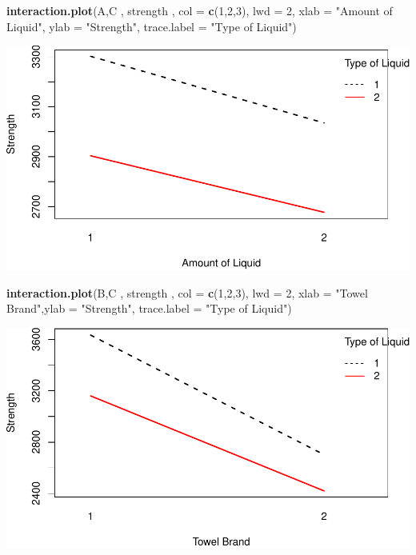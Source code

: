 \documentclass[12pt,]{article}
\newenvironment{Shaded}{\begin{snugshade}}{\end{snugshade}}
\newcommand{\KeywordTok}[1]{\textcolor[rgb]{0.13,0.29,0.53}{\textbf{#1}}}
\newcommand{\DataTypeTok}[1]{\textcolor[rgb]{0.13,0.29,0.53}{#1}}
\newcommand{\DecValTok}[1]{\textcolor[rgb]{0.00,0.00,0.81}{#1}}
\newcommand{\StringTok}[1]{\textcolor[rgb]{0.31,0.60,0.02}{#1}}
\newcommand{\NormalTok}[1]{#1}
\begin{document}
\begin{Shaded}
\begin{Highlighting}[]
\KeywordTok{interaction.plot}\NormalTok{(A,C , strength , }\DataTypeTok{col =} \KeywordTok{c}\NormalTok{(}\DecValTok{1}\NormalTok{,}\DecValTok{2}\NormalTok{,}\DecValTok{3}\NormalTok{), }\DataTypeTok{lwd =} \DecValTok{2}\NormalTok{,}
                 \DataTypeTok{xlab =} \StringTok{"Amount of Liquid"}\NormalTok{, }\DataTypeTok{ylab =} \StringTok{"Strength"}\NormalTok{, }
                 \DataTypeTok{trace.label =} \StringTok{"Type of Liquid"}\NormalTok{)}
\end{Highlighting}
\end{Shaded}

\includegraphics{Markdown_HW_7_files/figure-latex/unnamed-chunk-2-2.pdf}

\begin{Shaded}
\begin{Highlighting}[]
\KeywordTok{interaction.plot}\NormalTok{(B,C , strength , }\DataTypeTok{col =} \KeywordTok{c}\NormalTok{(}\DecValTok{1}\NormalTok{,}\DecValTok{2}\NormalTok{,}\DecValTok{3}\NormalTok{), }\DataTypeTok{lwd =} \DecValTok{2}\NormalTok{, }
                 \DataTypeTok{xlab =} \StringTok{"Towel Brand"}\NormalTok{,}\DataTypeTok{ylab =} \StringTok{"Strength"}\NormalTok{, }
                 \DataTypeTok{trace.label =} \StringTok{"Type of Liquid"}\NormalTok{)}
\end{Highlighting}
\end{Shaded}

\includegraphics{Markdown_HW_7_files/figure-latex/unnamed-chunk-2-3.pdf}
\end{document}
